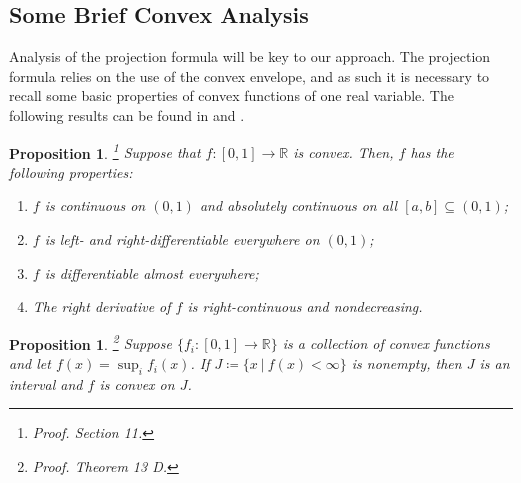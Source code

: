 \documentclass[10pt,a4paper]{amsart}
\newtheorem{prop}[thm]{Proposition}
\newtheorem{defn}[thm]{Definition}
\numberwithin{equation}{section}
\begin{document}
\subsection{Some Brief Convex Analysis}

    Analysis of the projection formula will be key to our approach. The projection formula relies on the use of the convex envelope, and as such it is necessary to recall some basic properties of convex functions of one real variable. The following results can be found in \cite{Roberts} and \cite{Rockafellar}.  
    \begin{prop}\label{convex-properties} \!\!\!\! \footnote{\textit{Proof.} \cite{Roberts} Section 11.}
        Suppose that $f:[0,1]\to\mathbb{R}$ is convex. Then, $f$ has the following properties:
        \begin{enumerate}[label=\textup{(\roman*)}]
            \item $f$ is continuous on $(0,1)$ and absolutely continuous on all $[a,b]\subseteq(0,1)$;
            \item $f$ is left- and right-differentiable everywhere on $(0,1)$;
            \item $f$ is differentiable almost everywhere;
            \item The right derivative of $f$ is right-continuous and nondecreasing. 
        \end{enumerate}
    \end{prop}
    \begin{prop}\label{pointwise-sup} \!\!\!\! \footnote{\textit{Proof.} \cite{Roberts} Theorem 13 D.}
        Suppose $\{f_i:[0, 1]\to\mathbb{R}\}$ is a collection of convex functions and let $f(x)=\sup_i f_i(x)$. %
        If $J\coloneq\{x \ | \ f(x)<\infty\}$ is nonempty, then $J$ is an interval and $f$ is convex on $J$. 
    \end{prop}
\end{document}
